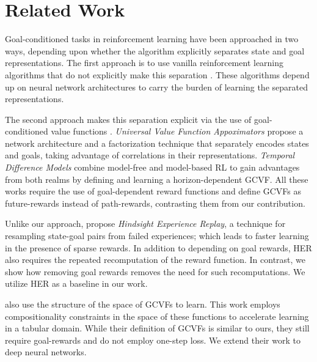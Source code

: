 \section{Related Work}

Goal-conditioned tasks in reinforcement learning have been approached in two
ways, depending upon whether the algorithm explicitly separates state and goal
representations.
The first approach is to use vanilla reinforcement
learning algorithms that do not explicitly make this separation
\citep{mirowski2016learning,dosovitskiy2016learning,gupta2017cognitive,parisotto2017neural,mirowski2018learning}.
These algorithms depend up on neural network architectures to
carry the burden of learning the separated representations.

The second approach makes this separation explicit via the use of goal-conditioned value
functions \citep{foster2002structure,sutton2011horde}. \emph{Universal
Value Function Appoximators} \citep{schaul2015universal} propose a
network architecture and a factorization technique that separately
encodes states and goals, taking advantage of correlations in their representations.
\emph{Temporal Difference Models} combine model-free
and model-based RL to gain advantages from both realms by defining and learning
a horizon-dependent GCVF. All these works require the use of
goal-dependent reward functions and define GCVFs as future-rewards instead of
path-rewards, contrasting them from our contribution. 

Unlike our approach, \citet{andrychowicz2017hindsight} propose \emph{Hindsight Experience Replay},
a technique for resampling state-goal pairs from failed experiences; which leads
to faster learning in the presence of sparse rewards. In addition to depending
on goal rewards, HER also requires the repeated recomputation of the reward
function. In contrast, we show how removing goal rewards removes the need for
such recomputations. We utilize HER as a baseline in our work.

\citet{dhiman2018floydwarshall} also use the structure of the space of GCVFs to
learn.
This work employs compositionality constraints
in the space of these functions to accelerate learning in a tabular domain. While
their definition of GCVFs is similar to ours, they still require
goal-rewards and do not employ one-step loss. We extend their
work to deep neural networks.


